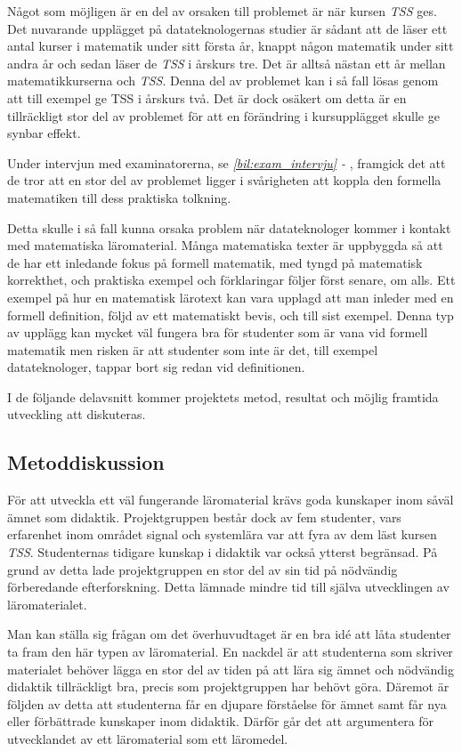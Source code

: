\documentclass[12pt,a4paper,twoside,openright]{article}
\begin{document}
Något som möjligen är en del av orsaken till problemet är när kursen
\textit{TSS} ges. Det nuvarande upplägget på datateknologernas studier
är sådant att de läser ett antal kurser i matematik under sitt första
år, knappt någon matematik under sitt andra år och sedan läser de
\textit{TSS} i årskurs tre. Det är alltså nästan ett år mellan
matematikkurserna och \textit{TSS}. Denna del av problemet kan i så
fall lösas genom att till exempel ge TSS i årskurs två. Det är dock
osäkert om detta är en tillräckligt stor del av problemet för att en
förändring i kursupplägget skulle ge synbar effekt.

Under intervjun med examinatorerna, se \textit{\ref{bil:exam_intervju} - }, framgick det
att de tror att en stor del av problemet ligger i svårigheten att
koppla den formella matematiken till dess praktiska tolkning.

Detta skulle i så fall kunna orsaka problem när datateknologer kommer
i kontakt med matematiska läromaterial. Många matematiska texter är
uppbyggda så att de har ett inledande fokus på formell matematik, med
tyngd på matematisk korrekthet, och praktiska exempel och förklaringar
följer först senare, om alls. Ett exempel på hur en matematisk
lärotext kan vara upplagd att man inleder med en formell definition,
följd av ett matematiskt bevis, och till sist exempel. Denna typ av
upplägg kan mycket väl fungera bra för studenter som är vana vid
formell matematik men risken är att studenter som inte är det, till
exempel datateknologer, tappar bort sig redan vid definitionen.

I de följande delavsnitt kommer projektets metod, resultat och möjlig
framtida utveckling att diskuteras.

\subsection{Metoddiskussion}
\label{sec:metDisk}
För att utveckla ett väl fungerande läromaterial krävs goda kunskaper
inom såväl ämnet som didaktik. Projektgruppen består dock av fem studenter, vars erfarenhet
inom området signal och systemlära var att fyra av dem läst kursen
\textit{TSS}. Studenternas tidigare kunskap i didaktik var också
ytterst begränsad. På grund av detta lade projekt\-gruppen en stor del
av sin tid på nödvändig förberedande efterforskning. Detta lämnade
mindre tid till själva utvecklingen av läromaterialet.

Man kan ställa sig frågan om det överhuvudtaget är en bra idé att
låta studenter ta fram den här typen av läromaterial. En nackdel
är att studenterna som skriver materialet behöver lägga en stor
del av tiden på att lära sig ämnet och nödvändig didaktik
tillräckligt bra, precis som projektgruppen har behövt göra.
Däremot är följden av detta att studenterna
får en djupare förståelse för ämnet samt får nya
eller förbättrade kunskaper inom didaktik.
Därför går det att argumentera för utvecklandet av ett läromaterial
som ett läromedel.
\end{document}
